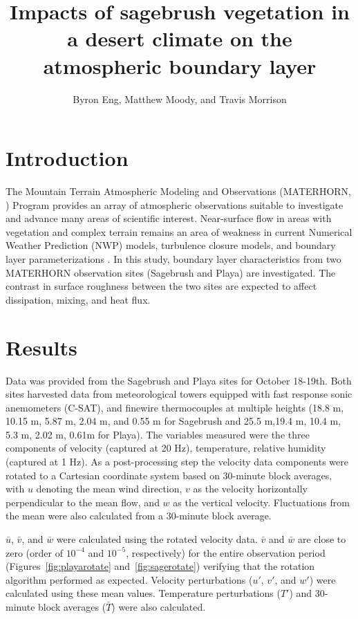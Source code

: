 \documentclass[]{article}
\title{Impacts of sagebrush vegetation in a desert climate on the atmospheric boundary layer}
\author{Byron Eng, Matthew Moody, and Travis Morrison}
\begin{document}
\maketitle


\section{Introduction}
The Mountain Terrain Atmospheric Modeling and Observations (MATERHORN, \citealt{MATERHORN}) Program provides an array of atmospheric observations suitable to investigate and advance many areas of scientific interest. Near-surface flow in areas with vegetation and complex terrain remains an area of weakness in current Numerical Weather Prediction (NWP) models, turbulence closure models, and boundary layer parameterizations \citep{MATERHORN}. In this study, boundary layer characteristics from two MATERHORN observation sites (Sagebrush and Playa) are investigated. The contrast in surface roughness between the two sites are expected to affect dissipation, mixing, and heat flux.

\section{Results}
Data was provided from the Sagebrush and Playa sites for October 18-19th. Both sites harvested data from meteorological towers equipped with fast response sonic anemometers (C-SAT), and finewire thermocouples at multiple heights (18.8 m, 10.15 m, 5.87 m, 2.04 m, and 0.55 m for Sagebrush and 25.5 m,19.4 m, 10.4 m, 5.3 m, 2.02 m, 0.61m for Playa). The variables measured were the three components of velocity (captured at 20 Hz), temperature, relative humidity (captured at 1 Hz). As a post-processing step the velocity data components were rotated to a Cartesian coordinate system based on 30-minute block averages, with $u$ denoting the mean wind direction, $v$ as the velocity horizontally perpendicular to the mean flow, and $w$ as the vertical velocity. Fluctuations from the mean were also calculated from a 30-minute block average. 

$\bar{u}$, $\bar{v}$, and $\bar{w}$ were calculated using the rotated velocity data. $\bar{v}$ and $\bar{w}$ are close to zero (order of $10^{-4}$ and $10^{-5}$, respectively) for the entire observation period (Figures~\ref{fig:playarotate} and~\ref{fig:sagerotate}) verifying that the rotation algorithm performed as expected. Velocity perturbations ($u'$, $v'$, and $w'$) were calculated using these mean values. Temperature perturbations ($T'$) and 30-minute block averages ($\bar{T}$) were also calculated.
\end{document}
